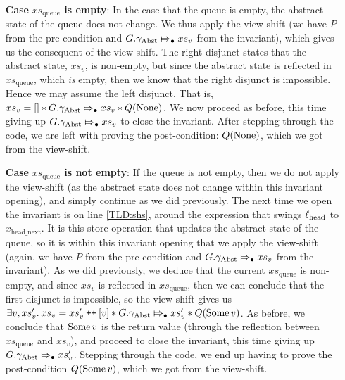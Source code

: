 \documentclass[a4paper, 10pt]{report}
\theoremstyle{definition}
\newcommand{\xsqueue}{xs_{\mathrm{queue}}}
\newcommand{\locN}[1]{\loc_{\mathrm{#1}}}
\newcommand{\lochead}{\locN{head}}
\newcommand{\node}{x}
\newcommand{\nodeN}[1]{\node_{\mathrm{#1}}}
\newcommand{\nodeheadnext}{\nodeN{head\_next}}
\newcommand{\absvalue}{\val}
\newcommand{\absvalueList}{xs_v}
\newcommand{\Qg}{G}
\newcommand{\gabst}{\gname_{\mathrm{Abst}}}
\newcommand\catenate{\mathbin{\text{\ttfamily\upshape ++}}}
\newcommand{\abstractstateauth}[2]{#1 \Mapsto_{\bullet} #2}
\begin{document}
\begin{itemize}
  \item[\textbf{Case}] \textbf{$\xsqueue$ is empty}:
  In the case that the queue is empty, the abstract state of the queue does not change. We thus apply the view-shift (we have $P$ from the pre-condition and $\abstractstateauth{\Qg.\gabst}{\absvalueList}$ from the invariant), which gives us the consequent of the view-shift. The right disjunct states that the abstract state, $\absvalueList$, is non-empty, but since the abstract state is reflected in $\xsqueue$, which \emph{is} empty, then we know that the right disjunct is impossible. Hence we may assume the left disjunct. That is, $\absvalueList = [] \star{} \abstractstateauth{\Qg.\gabst}{\absvalueList} \star{} Q(\None)$. We now proceed as before, this time giving up $\abstractstateauth{\Qg.\gabst}{\absvalueList}$ to close the invariant. After stepping through the code, we are left with proving the post-condition: $Q(\operatorname{None})$, which we got from the view-shift.

  \item[\textbf{Case}] \textbf{$\xsqueue$ is not empty}:
  If the queue is not empty, then we do not apply the view-shift (as the abstract state does not change within this invariant opening), and simply continue as we did previously. The next time we open the invariant is on line \ref{TLD:shs}, around the expression that swings $\lochead$ to $\nodeheadnext$. It is this store operation that updates the abstract state of the queue, so it is within this invariant opening that we apply the view-shift (again, we have $P$ from the pre-condition and $\abstractstateauth{\Qg.\gabst}{\absvalueList}$ from the invariant). As we did previously, we deduce that the current $\xsqueue$ is non-empty, and since $\absvalueList$ is reflected in $\xsqueue$, then we can conclude that the first disjunct is impossible, so the view-shift gives us $\Exists \absvalue, \absvalueList' . \absvalueList = \absvalueList' \catenate [\absvalue] \star{} \abstractstateauth{\Qg.\gabst}{\absvalueList'} \star{} Q(\Some{\absvalue})$. As before, we conclude that $\Some{\absvalue}$ is the return value (through the reflection between $\xsqueue$ and $\absvalueList$), and proceed to close the invariant, this time giving up $\abstractstateauth{\Qg.\gabst}{\absvalueList'}$. Stepping through the code, we end up having to prove the post-condition $Q(\Some{\absvalue})$, which we got from the view-shift.
\end{itemize}

\end{document}
